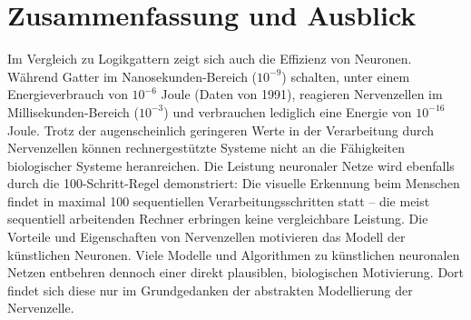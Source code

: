 
\chapter{Zusammenfassung und Ausblick}
\label{chapter-fazit}

Im Vergleich zu Logikgattern zeigt sich auch die Effizienz von Neuronen. Während Gatter im Nanosekunden-Bereich (${10}^{- 9}$) schalten, unter einem Energieverbrauch von ${10}^{-6}$ Joule (Daten von 1991), reagieren Nervenzellen im Millisekunden-Bereich (${10}^{-3}$) und verbrauchen lediglich eine Energie von ${10}^{-16}$ Joule. Trotz der augenscheinlich geringeren Werte in der Verarbeitung durch Nervenzellen können rechnergestützte Systeme nicht an die Fähigkeiten biologischer Systeme heranreichen. Die Leistung neuronaler Netze wird ebenfalls durch die 100-Schritt-Regel demonstriert: Die visuelle Erkennung beim Menschen findet in maximal 100 sequentiellen Verarbeitungsschritten statt – die meist sequentiell arbeitenden Rechner erbringen keine vergleichbare Leistung. Die Vorteile und Eigenschaften von Nervenzellen motivieren das Modell der künstlichen Neuronen. Viele Modelle und Algorithmen zu künstlichen neuronalen Netzen entbehren dennoch einer direkt plausiblen, biologischen Motivierung. Dort findet sich diese nur im Grundgedanken der abstrakten Modellierung der Nervenzelle.